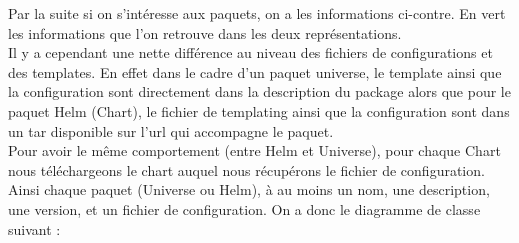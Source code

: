 \documentclass[11pt,fleqn]{book} %
\begin{document}
Par la suite si on s'intéresse aux paquets, on a les informations ci-contre. En vert les informations que l'on retrouve dans les deux représentations. \\

Il y a cependant une nette différence au niveau des fichiers de configurations et des templates. En effet dans le cadre d'un paquet universe, le template ainsi que la configuration sont directement dans la description du package alors que pour le paquet Helm (Chart), le fichier de templating ainsi que la configuration sont dans un tar disponible sur l'url qui accompagne le paquet. \\

Pour avoir le même comportement (entre Helm et Universe), pour chaque Chart nous téléchargeons le chart auquel nous récupérons le fichier de configuration. Ainsi chaque paquet (Universe ou Helm), à au moins un nom, une description, une version, et un fichier de configuration. On a donc le diagramme de classe suivant :
\end{document}

